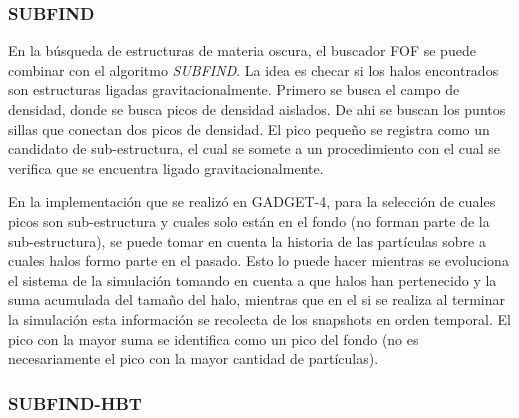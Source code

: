 \subsubsection{SUBFIND}
En la búsqueda de estructuras de materia oscura, el buscador FOF se puede combinar con el algoritmo \textit{SUBFIND}. La idea es checar si los halos encontrados son estructuras ligadas gravitacionalmente. Primero se busca el campo de densidad, donde se busca picos de densidad aislados. De ahi se buscan los puntos sillas que conectan dos picos de densidad. El pico pequeño se registra como un candidato de sub-estructura, el cual se somete a un procedimiento con el cual se verifica que se encuentra ligado gravitacionalmente. 

En la implementación que se realizó en GADGET-4, para la selección de cuales picos son sub-estructura y cuales solo están en el fondo (no forman parte de la sub-estructura), se puede tomar en cuenta la historia de las partículas sobre a cuales halos formo parte en el pasado. Esto lo puede hacer mientras se evoluciona el sistema de la simulación tomando en cuenta a que halos han pertenecido y la suma acumulada del tamaño del halo, mientras que en el si se realiza al terminar la simulación esta información se recolecta de los snapshots en orden temporal. El pico con la mayor suma se identifica como un pico del fondo (no es necesariamente el pico con la mayor cantidad de partículas).

\subsubsection{SUBFIND-HBT}